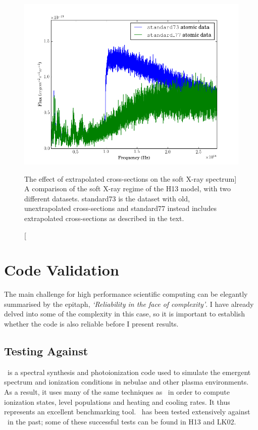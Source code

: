 \begin{figure}
\centering
\includegraphics[width=1.0\textwidth]{figures/03-radtrans/xs.png}
\caption
[The effect of extrapolated cross-sections on the soft X-ray spectrum]
{
A comparison of the soft X-ray regime of the H13 model, with two different
datasets. standard73 is the dataset with old, unextrapolated cross-sections 
and standard77 instead includes extrapolated cross-sections as described in
the text.
}
\label{fig:xs}
\end{figure}

\section{Code Validation}
\label{sec:code_validation}

The main challenge for high performance scientific computing can be 
elegantly summarised by the \cite{ferland2002} epitaph, {\sl `Reliability in the face 
of complexity'}. I have already delved into some of the complexity in this case,
so it is important to establish whether the code is also reliable before I present
results. 

\subsection{Testing Against \cld}

\index{\cld}
\cld\ is a spectral synthesis and photoionization code used to simulate
the emergent spectrum and ionization conditions in nebulae and other plasma
environments. As a result, it uses many of the same techniques as \py\
in order to compute ionization states, level populations and heating and cooling
rates. It thus represents an excellent benchmarking tool. \py\ has been tested extensively
against \cld\ in the past; some of these successful
tests can be found in H13 and LK02.

